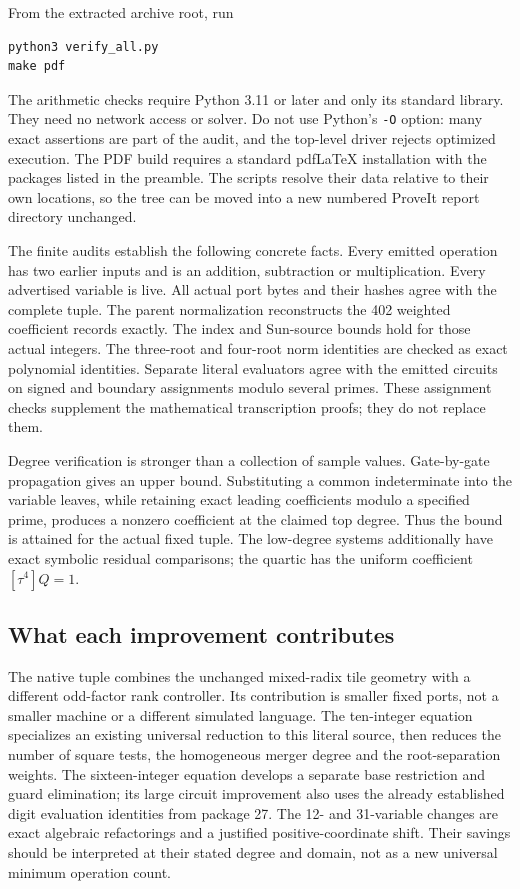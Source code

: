 From the extracted archive root, run
\begin{verbatim}
python3 verify_all.py
make pdf
\end{verbatim}
The arithmetic checks require Python 3.11 or later and only its standard
library.  They need no network access or solver.  Do not use Python's
\texttt{-O} option: many exact assertions are part of the audit, and the
top-level driver rejects optimized execution.  The PDF build requires a
standard pdfLaTeX installation with the packages listed in the preamble.
The scripts resolve their data relative to their own locations, so the
tree can be moved into a new numbered ProveIt report directory unchanged.

The finite audits establish the following concrete facts.  Every emitted
operation has two earlier inputs and is an addition, subtraction or
multiplication.  Every advertised variable is live.  All actual port
bytes and their hashes agree with the complete tuple.  The parent
normalization reconstructs the 402 weighted coefficient records exactly.
The index and Sun-source bounds hold for those actual integers.  The
three-root and four-root norm identities are checked as exact polynomial
identities.  Separate literal evaluators agree with the emitted circuits
on signed and boundary assignments modulo several primes.  These
assignment checks supplement the mathematical transcription proofs; they
do not replace them.

Degree verification is stronger than a collection of sample values.
Gate-by-gate propagation gives an upper bound.  Substituting a common
indeterminate into the variable leaves, while retaining exact leading
coefficients modulo a specified prime, produces a nonzero coefficient at
the claimed top degree.  Thus the bound is attained for the actual fixed
tuple.  The low-degree systems additionally have exact symbolic residual
comparisons; the quartic has the uniform coefficient $[\tau^4]Q=1$.

\subsection{What each improvement contributes}

The native tuple combines the unchanged mixed-radix tile geometry with a
different odd-factor rank controller.  Its contribution is smaller fixed
ports, not a smaller machine or a different simulated language.  The
ten-integer equation specializes an existing universal reduction to this
literal source, then reduces the number of square tests, the homogeneous
merger degree and the root-separation weights.  The sixteen-integer
equation develops a separate base restriction and guard elimination; its
large circuit improvement also uses the already established digit
evaluation identities from package 27.  The 12- and 31-variable changes
are exact algebraic refactorings and a justified positive-coordinate
shift.  Their savings should be interpreted at their stated degree and
domain, not as a new universal minimum operation count.

